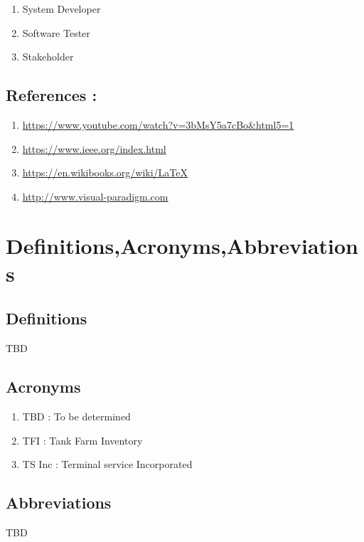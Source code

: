 \begin{flushleft}
		\begin{enumerate}
			\item System Developer
			\item Software Tester
			\item Stakeholder		
		\end{enumerate}
		
\subsection{References :}
		\vspace*{1\baselineskip}
		\begin{enumerate}
			\item \url{https://www.youtube.com/watch?v=3bMsY5a7cBo&html5=1}
			\item \url{https://www.ieee.org/index.html}
			\item \url{https://en.wikibooks.org/wiki/LaTeX}
			\item \url{http://www.visual-paradigm.com}
		\end{enumerate}
		
\section{Definitions,Acronyms,Abbreviations}		

\subsection{Definitions}
					TBD

\subsection{Acronyms}
		\vspace*{1\baselineskip}
		\begin{enumerate}
			\item TBD : To be determined
			\item TFI : Tank Farm Inventory
			\item TS Inc : Terminal service Incorporated
		\end{enumerate}
		
\subsection{Abbreviations}
				TBD

\end{flushleft}